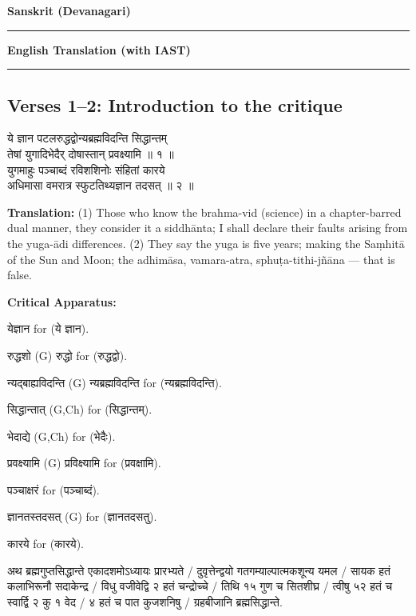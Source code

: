 \documentclass[11pt,a4paper]{article}
\newcommand{\dev}[1]{{\devanagarifont #1}}
\newcommand{\sanskritcol}[1]{%
  \begin{minipage}[t]{0.47\textwidth}
  \vspace{0pt}
  \begin{flushleft}
  #1
  \end{flushleft}
  \end{minipage}%
  \hfill
}
\newcommand{\englishcol}[1]{%
  \begin{minipage}[t]{0.47\textwidth}
  \vspace{0pt}
  \begin{flushleft}
  #1
  \end{flushleft}
  \end{minipage}%
}
\newcommand{\columnheaders}{%
  \noindent
  \begin{minipage}[t]{0.47\textwidth}
  \centering
  \textbf{\large Sanskrit (Devanagari)}\\[0.1cm]
  \rule{0.8\textwidth}{0.5pt}
  \end{minipage}%
  \hfill
  \begin{minipage}[t]{0.47\textwidth}
  \centering
  \textbf{\large English Translation (with IAST)}\\[0.1cm]
  \rule{0.8\textwidth}{0.5pt}
  \end{minipage}%
  \vspace{0.3cm}
  \par
}
\newenvironment{variants}{%
  \small%
  \color{varecolor}%
  \list{}{\leftmargin=2em\itemindent=-1em}%
}{\endlist}
\begin{document}
\vspace{0.3cm}
\columnheaders

\subsection*{Verses 1--2: Introduction to the critique}

\noindent
\sanskritcol{\dev{ये ज्ञान पटलरुद्धद्वोन्यब्रह्मविदन्ति सिद्धान्तम्} \\ \dev{तेषां युगादिभेदैर् दोषास्तान् प्रवक्ष्यामि ॥ १ ॥} \\[0.2cm]
\dev{युगमाहुः पञ्चाब्दं रविशशिनोः संहितां कारये} \\ \dev{अधिमासा वमरात्र स्फुटतिथ्यज्ञान तदसत् ॥ २ ॥}}
\englishcol{\textbf{Translation:} (1) Those who know the brahma-vid (science) in a chapter-barred
dual manner, they consider it a siddhānta; I shall declare their faults arising from
the yuga-ādi differences. (2) They say the yuga is five years; making the Saṃhitā
of the Sun and Moon; the adhimāsa, vamara-atra, sphuṭa-tithi-jñāna --- that is false.}

\vspace{0.4cm}
\textcolor{varecolor}{\textbf{Critical Apparatus:}}
\begin{variants}
\item[1.1] \dev{येज्ञान} \dev{for} (\dev{ये ज्ञान}).
\item[1.2] \dev{रुद्धशो} (G) \dev{रुद्धो} \dev{for} (\dev{रुद्धद्वो}).
\item[1.3] \dev{न्यद्बाह्यविदन्ति} (G) \dev{न्यब्रह्मविदन्ति} \dev{for} (\dev{न्यब्रह्मविदन्ति}).
\item[1.4] \dev{सिद्धान्तात्} (G,Ch) \dev{for} (\dev{सिद्धान्तम्}).
\item[1.5] \dev{भेदाद्ये} (G,Ch) \dev{for} (\dev{भेदैः}).
\item[1.6] \dev{प्रवक्ष्यामि} (G) \dev{प्रविक्ष्यामि} \dev{for} (\dev{प्रवक्षामि}).
\item[2.1] \dev{पञ्चाक्षरं} \dev{for} (\dev{पञ्चाब्दं}).
\item[2.2] \dev{ज्ञानतस्तदसत्} (G) \dev{for} (\dev{ज्ञानतदसतु}).
\item[2.3] \dev{कारये} \dev{for} (\dev{कारये}).
\item[\dev{वि०--अतिरिक्त पाठः}] \dev{अथ ब्रह्मगुप्तसिद्धान्ते एकादशमोऽध्यायः प्रारभ्यते} /
\dev{दुवृत्तेन्द्वयो गतगम्याल्पात्मकशून्य यमल} /
\dev{सायक हतं कलाभिरूनौ सदाकेन्द्र} / \dev{विधु वजीवेद्वि २ हतं चन्द्रोच्चे} /
\dev{तिथि १५ गुण च सितशीघ्र} /
\dev{त्वीषु ५२ हतं च स्वार्द्वि २ कु १ वेद} /
\dev{४ हतं च पात कुजशनिषु} /
\dev{ग्रहबीजानि ब्रह्मसिद्धान्ते}.
\end{variants}
\end{document}
